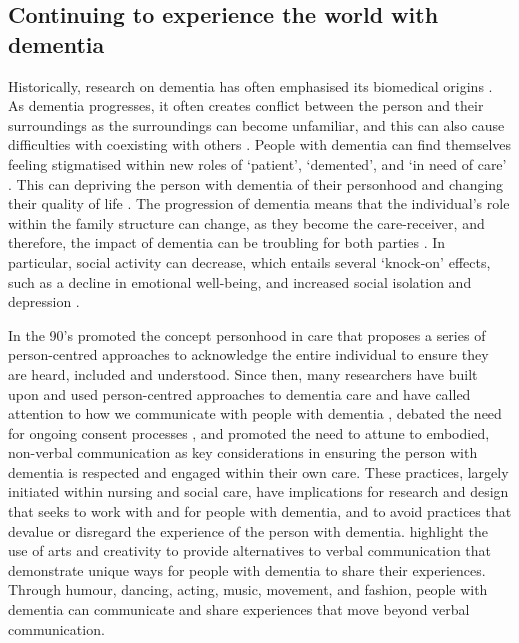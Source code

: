\subsection{Continuing to experience the world with dementia}
\label{Context:Dementia}
Historically, research on dementia has often emphasised its biomedical origins \citep{lyman_bringing_1989}. As dementia progresses, it often creates conflict between the person and their surroundings as the surroundings can become unfamiliar, and this can also cause difficulties with coexisting with others \citep{langdon_making_2007}. People with dementia can find themselves feeling stigmatised within new roles of `patient', `demented', and `in need of care' \citep{cohen-mansfield_utilization_2006}. This can depriving the person with dementia of their personhood and changing their quality of life \citep{lawrence_improving_2012}. The progression of dementia means that the individual's role within the family structure can change, as they become the care-receiver, and therefore, the impact of dementia can be troubling for both parties \citep{dupuis_moving_2012}. In particular, social activity can decrease, which entails several `knock-on' effects, such as a decline in emotional well-being, and increased social isolation and depression \citep{bartlett_citizenship_2014}. 

In the 90's \cite{kitwood_towards_1992} promoted the concept personhood in care that proposes a series of person-centred approaches to acknowledge the entire individual to ensure they are heard, included and understood. Since then, many researchers have built upon and used person-centred approaches to dementia care and have called attention to how we communicate with people with dementia \citep{oyebode_mental_2005}, debated the need for ongoing consent processes \citep{dewing_participatory_2007}, and promoted the need to attune to embodied, non-verbal communication \citep{group_patron_2019, twigg_dress_2013} as key considerations in ensuring the person with dementia is respected and engaged within their own care. These practices, largely initiated within nursing and social care, have implications for research and design that seeks to work with and for people with dementia, and to avoid practices that devalue or disregard the experience of the person with dementia. \cite{john_killick_claire_craig_creativity_2012} highlight the use of arts and creativity to provide alternatives to verbal communication that demonstrate unique ways for people with dementia to share their experiences. Through humour, dancing, acting, music, movement, and fashion, people with dementia can communicate and share experiences that move beyond verbal communication.

